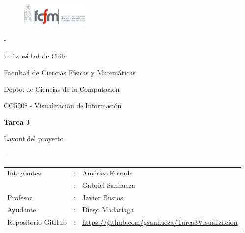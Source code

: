 \documentclass[letterpaper,10pt]{article}
\begin{document}
	\begin{titlepage}

		\begin{figure}
			\includegraphics[width=0.3\textwidth]{logoFCFM.png}
		\end{figure}

		\noindent \phantom - %

		Universidad de Chile

		Facultad de Ciencias Físicas y Matemáticas

		Depto. de Ciencias de la Computación

		CC5208 - Visualización de Información

		\vfill

		\begin{center}
			\begin{Huge}
				{\textbf{Tarea 3}}
			\end{Huge}

			\begin{large}
				Layout del proyecto
			\end{large}

		\end{center}
--
		\vfill

		\begin{flushright}
			\begin{tabular}{lll}
				Integrantes	&:	& Américo Ferrada\\
						&:	& Gabriel Sanhueza\\
				Profesor	&:	& Javier Bustos\\
				Ayudante	&:	& Diego Madariaga\\
				Repositorio GitHub &:	& \url{https://github.com/gsanhueza/Tarea3Visualizacion}\\
			\end{tabular}
		\end{flushright}

	\end{titlepage}

	\newpage
\end{document}
